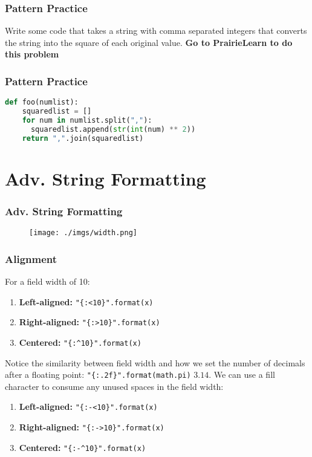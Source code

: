 \documentclass{beamer}
\begin{document}
%
%
\begin{frame}[fragile]
  \frametitle{Pattern Practice}
  Write some code that takes a string with comma separated integers
  that converts the string into the square of each original value.
  \vfill
  \textbf{Go to PrairieLearn to do this problem}
\end{frame}

%
%
\begin{frame}[fragile]
  \frametitle{Pattern Practice}
  \begin{lstlisting}[language=Python, autogobble]
  def foo(numlist):
    squaredlist = []
    for num in numlist.split(","):
      squaredlist.append(str(int(num) ** 2))
    return ",".join(squaredlist)
  \end{lstlisting}
\end{frame}

\section{Adv. String Formatting}

%
%
\begin{frame}[fragile]
  \frametitle{Adv. String Formatting}
	\begin{figure}
		\texttt{[image: ./imgs/width.png]}
	\end{figure}
\end{frame}

%
%
\begin{frame}[fragile]
  \frametitle{Alignment}
  For a field width of 10:
  \begin{enumerate}
    \item \textbf{Left-aligned: } \lstinline|"{:<10}".format(x)|
    \item \textbf{Right-aligned: } \lstinline|"{:>10}".format(x)|
    \item \textbf{Centered: } \lstinline|"{:^10}".format(x)|
  \end{enumerate}
  \vfill
  Notice the similarity between field width and how we set the number of decimals after a floating point: \lstinline|"{:.2f}".format(math.pi)| \textrightarrow $3.14$.
  \pause
  \vfill
  We can use a fill character to consume any unused spaces in the field width:
  \begin{enumerate}
    \item \textbf{Left-aligned: } \lstinline|"{:-<10}".format(x)|
    \item \textbf{Right-aligned: } \lstinline|"{:->10}".format(x)|
    \item \textbf{Centered: } \lstinline|"{:-^10}".format(x)|
  \end{enumerate}
\end{frame}
\end{document}
